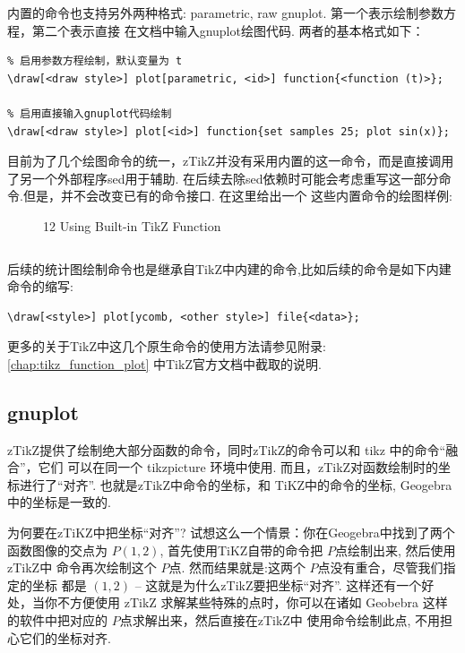 内置的命令也支持另外两种格式: {parametric, raw gnuplot}. 第一个表示绘制参数方程，第二个表示直接
在文档中输入gnuplot绘图代码. 两者的基本格式如下：
\begin{verbatim}
% 启用参数方程绘制，默认变量为 t
\draw[<draw style>] plot[parametric, <id>] function{<function (t)>};

% 启用直接输入gnuplot代码绘制
\draw[<draw style>] plot[<id>] function{set samples 25; plot sin(x)};
\end{verbatim}

目前为了几个绘图命令的统一，zTikZ并没有采用内置的这一命令，而是直接调用了另一个外部程序sed用于辅助.
在后续去除sed依赖时可能会考虑重写这一部分命令.但是，并不会改变已有的命令接口. 在这里给出一个
这些内置命令的绘图样例:

\begin{figure}[!htb]
    \centering
    
    \caption{12 Using Built-in TikZ Function}
    \label{fig:12-inverse-function-2}
\end{figure}

\inputminted{latex}{./gallery/example_12.tex}

后续的统计图绘制命令也是继承自TikZ中内建的命令,比如后续的\cmd{\BarPlot}命令是如下内建命令的缩写:
\begin{verbatim}
\draw[<style>] plot[ycomb, <other style>] file{<data>};
\end{verbatim}

更多的关于TikZ中这几个原生命令的使用方法请参见附录:\cref{chap:tikz_function_plot} 中TikZ官方文档中截取的说明.

\subsection{gnuplot}
zTikZ提供了绘制绝大部分函数的命令，同时zTikZ的命令可以和 {tikz} 中的命令``融合''，它们
可以在同一个 {tikzpicture} 环境中使用. 而且，zTikZ对函数绘制时的坐标进行了``对齐''. 
也就是zTikZ中命令的坐标，和 {TiKZ}中的命令的坐标, Geogebra中的坐标是一致的. 

为何要在zTiKZ中把坐标``对齐''? 试想这么一个情景：你在Geogebra中找到了两个函数图像的交点为 $P(1, 2)$,
首先使用TiKZ自带的\cmd{\filldraw}命令把 $P$点绘制出来, 然后使用zTikZ中
\cmd{\ShowPoint}命令再次绘制这个 $P$点. 然而结果就是:这两个 $P$点没有重合，尽管我们指定的坐标
都是 $(1, 2)$ -- 这就是为什么zTikZ要把坐标``对齐''. 这样还有一个好处，当你不方便使用 zTikZ 
求解某些特殊的点时，你可以在诸如 Geobebra 这样的软件中把对应的 $P$点求解出来，然后直接在zTikZ中
使用\cmd{\ShowPoint}命令绘制此点, 不用担心它们的坐标对齐.

